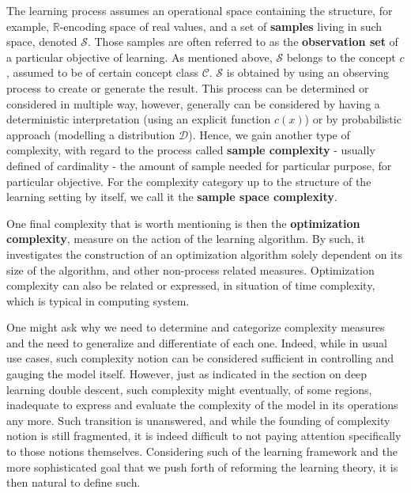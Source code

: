 \documentclass[
  journal=largetwo,
  year=2025,
  volume=37,
]{cup-journal}
\begin{document}
The learning process assumes an operational space containing the structure, for example, $\mathbb{R}$-encoding space of real values, and a set of \textbf{samples} living in such space, denoted $\mathcal{S}$. Those samples are often referred to as the \textbf{observation set} of a particular objective of learning. As mentioned above, $\mathcal{S}$ belongs to the concept $c$, assumed to be of certain concept class $\mathcal{C}$. $\mathcal{S}$ is obtained by using an observing process to create or generate the result. This process can be determined or considered in multiple way, however, generally can be considered by having a deterministic interpretation (using an explicit function $c(x)$) or by probabilistic approach (modelling a distribution $\mathcal{D}$). Hence, we gain another type of complexity, with regard to the process called \textbf{sample complexity} - usually defined of cardinality - the amount of sample needed for particular purpose, for particular objective. For the complexity category up to the structure of the learning setting by itself, we call it the \textbf{sample space complexity}. 

One final complexity that is worth mentioning is then the \textbf{optimization complexity}, measure on the action of the learning algorithm. By such, it investigates the construction of an optimization algorithm solely dependent on its size of the algorithm, and other non-process related measures. Optimization complexity can also be related or expressed, in situation of time complexity, which is typical in computing system. 

One might ask why we need to determine and categorize complexity measures and the need to generalize and differentiate of each one. Indeed, while in usual use cases, such complexity notion can be considered sufficient in controlling and gauging the model itself. However, just as \cite{James2021} indicated in the section on deep learning double descent, such complexity might eventually, of some regions, inadequate to express and evaluate the complexity of the model in its operations any more. Such transition is unanswered, and while the founding of complexity notion is still fragmented, it is indeed difficult to not paying attention specifically to those notions themselves. Considering such of the learning framework and the more sophisticated goal that we push forth of reforming the learning theory, it is then natural to define such. 

\clearpage

\nocite{*}
\printbibliography
\end{document}
